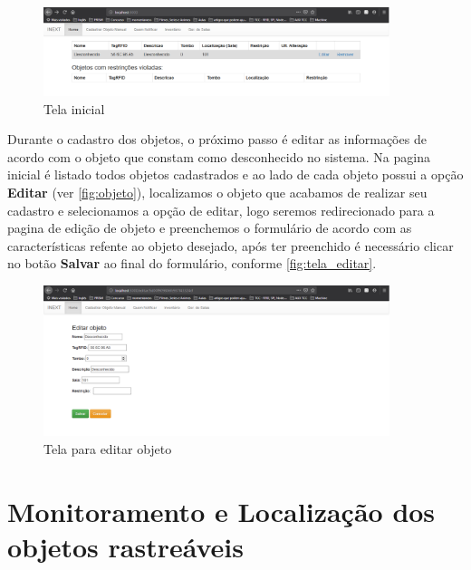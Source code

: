 \begin{figure}[H]
              \caption{\label{fig:tela_inical}Tela inicial}
              \centering
              \includegraphics[width=0.9\textwidth]{Figuras/tela_inical.PNG}
\end{figure}


\par
Durante o cadastro dos objetos, o próximo passo é editar as informações de acordo com o objeto que constam como desconhecido no sistema. Na pagina inicial é listado todos objetos cadastrados e ao lado de cada objeto possui a opção \textbf{Editar} (ver \autoref{fig:objeto}), localizamos o objeto que acabamos de realizar seu cadastro e selecionamos a opção de editar, logo seremos redirecionado para a pagina de edição de objeto e preenchemos o formulário de acordo com as características refente ao objeto desejado, após ter preenchido é necessário clicar no botão \textbf{Salvar} ao final do formulário, conforme \autoref{fig:tela_editar}.  

\begin{figure}[H]
              \caption{\label{fig:tela_editar}Tela para editar objeto }
              \centering
              \includegraphics[width=0.9\textwidth]{Figuras/tela_editar.png}
\end{figure}


\section{Monitoramento e Localização dos objetos rastreáveis}

